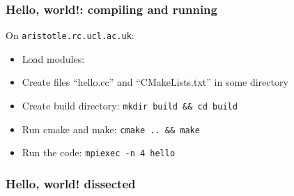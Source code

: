 \begin{Shaded}
\begin{Highlighting}[]
\NormalTok{)}

  \NormalTok{)}
 \NormalTok{)}
\end{Highlighting}
\end{Shaded}

\subsubsection{Hello, world!: compiling and
running}\label{hello-world-compiling-and-running}

On \texttt{aristotle.rc.ucl.ac.uk}:

\begin{itemize}
\itemsep1pt\parskip0pt
\item
  Load modules:
\end{itemize}

\begin{Shaded}
\begin{Highlighting}[]
   
   
   
   
\end{Highlighting}
\end{Shaded}

\begin{itemize}
\itemsep1pt\parskip0pt
\item
  Create files ``hello.cc'' and ``CMakeLists.txt'' in some directory
\item
  Create build directory: \texttt{mkdir build \&\& cd build}
\item
  Run cmake and make: \texttt{cmake .. \&\& make}
\item
  Run the code: \texttt{mpiexec -n 4 hello}
\end{itemize}

\subsubsection{Hello, world! dissected}\label{hello-world-dissected}

